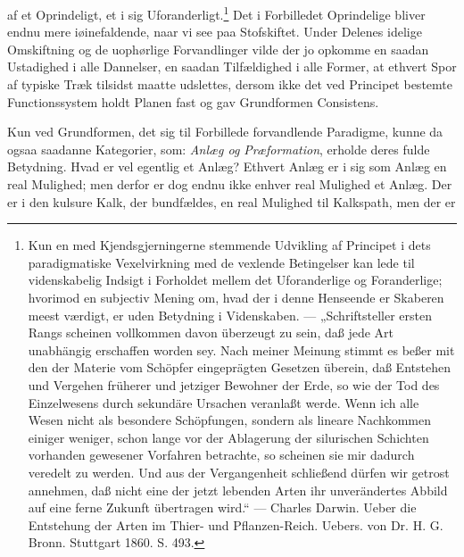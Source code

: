\documentclass[12pt,a4paper]{book}
\begin{document}
\setcounter{footnote}{0}
af et Oprindeligt, et i sig Uforanderligt.\footnote{Kun en med
Kjendsgjerningerne stemmende Udvikling af Principet i dets
paradigmatiske Vexelvirkning med de vexlende Betingelser kan lede til
videnskabelig Indsigt i Forholdet mellem det Uforanderlige og
Foranderlige; hvorimod en subjectiv Mening om, hvad der i denne Henseende
er Skaberen meest værdigt, er uden Betydning i Videnskaben. ---
„Schriftsteller ersten Rangs scheinen vollkommen davon überzeugt zu sein,
daß jede Art unabhängig erschaffen worden sey. Nach meiner Meinung
stimmt es beßer mit den der Materie vom Schöpfer eingeprägten Gesetzen
überein, daß Entstehen und Vergehen früherer und jetziger Bewohner der
Erde, so wie der Tod des Einzelwesens durch sekundäre Ursachen veranlaßt
werde. Wenn ich alle Wesen nicht als besondere Schöpfungen, sondern als
lineare Nachkommen einiger weniger, schon lange vor der Ablagerung der
silurischen Schichten vorhanden gewesener Vorfahren betrachte, so
scheinen sie mir dadurch veredelt zu werden. Und aus der Vergangenheit
schließend dürfen wir getrost annehmen, daß nicht eine der jetzt
lebenden Arten ihr unverändertes Abbild auf eine ferne Zukunft übertragen
wird.“ --- Charles Darwin. Ueber die Entstehung der Arten im Thier- und
Pflanzen-Reich. Uebers. von Dr. H. G. Bronn. Stuttgart 1860. S. 493.}
Det i Forbilledet Oprindelige bliver endnu mere iøinefaldende, naar vi
see paa Stofskiftet. Under Delenes idelige Omskiftning og de uophørlige
Forvandlinger vilde der jo opkomme en saadan Ustadighed i alle Dannelser,
en saadan Tilfældighed i alle Former, at ethvert Spor af typiske Træk
tilsidst maatte udslettes, dersom ikke det ved Principet bestemte
Functionssystem holdt Planen fast og gav Grundformen Consistens.

Kun ved Grundformen, det sig til Forbillede forvandlende Paradigme, kunne
da ogsaa saadanne Kategorier, som: \emph{Anlæg og Præformation}, erholde
deres fulde Betydning. Hvad er vel egentlig et Anlæg? Ethvert Anlæg er i
sig som Anlæg en real Mulighed; men derfor er dog endnu ikke enhver real
Mulighed et Anlæg. Der er i den kulsure Kalk, der bundfældes, en real
Mulighed til Kalkspath, men der er
\end{document}
